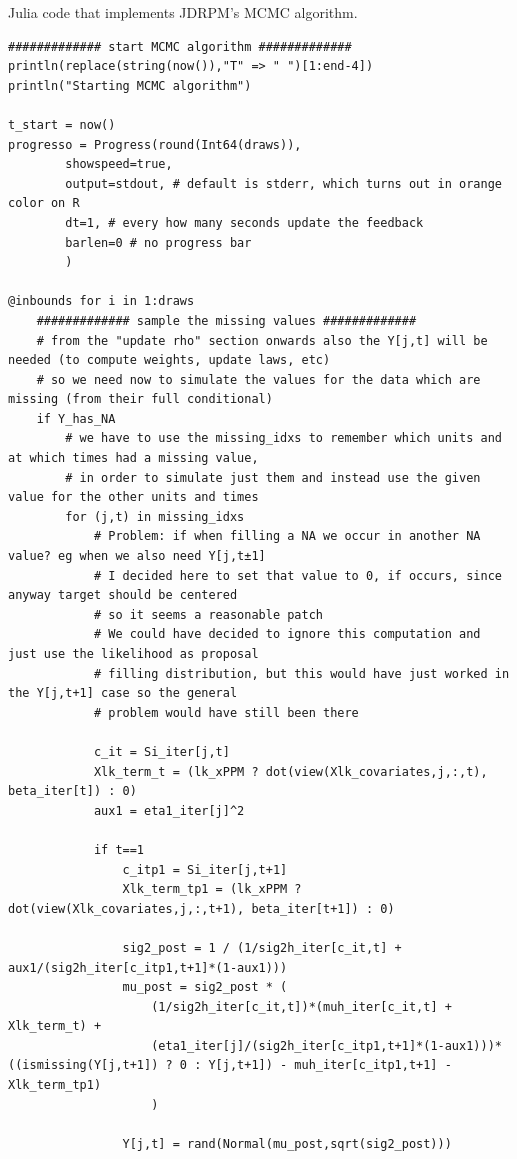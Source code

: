 \documentclass[12pt,	%
	a4paper,		%
	twoside,		%
	openright,		%
	titlepage,%
	]{book}
\theoremstyle{definition}
\newenvironment{code}{\captionsetup{type=listing}}{}
\begin{document}
\begin{code}
\caption[Julia code of the JDRPM algorithm]{Julia code that implements JDRPM's MCMC algorithm.}
\begin{verbatim}
############# start MCMC algorithm #############
println(replace(string(now()),"T" => " ")[1:end-4])
println("Starting MCMC algorithm")

t_start = now()
progresso = Progress(round(Int64(draws)),
		showspeed=true,
		output=stdout, # default is stderr, which turns out in orange color on R
		dt=1, # every how many seconds update the feedback
		barlen=0 # no progress bar
		)

@inbounds for i in 1:draws
	############# sample the missing values #############
	# from the "update rho" section onwards also the Y[j,t] will be needed (to compute weights, update laws, etc)
	# so we need now to simulate the values for the data which are missing (from their full conditional)
	if Y_has_NA
		# we have to use the missing_idxs to remember which units and at which times had a missing value,
		# in order to simulate just them and instead use the given value for the other units and times
		for (j,t) in missing_idxs
			# Problem: if when filling a NA we occur in another NA value? eg when we also need Y[j,t±1]
			# I decided here to set that value to 0, if occurs, since anyway target should be centered
			# so it seems a reasonable patch
			# We could have decided to ignore this computation and just use the likelihood as proposal
			# filling distribution, but this would have just worked in the Y[j,t+1] case so the general
			# problem would have still been there

			c_it = Si_iter[j,t]
			Xlk_term_t = (lk_xPPM ? dot(view(Xlk_covariates,j,:,t), beta_iter[t]) : 0)
			aux1 = eta1_iter[j]^2

			if t==1	
				c_itp1 = Si_iter[j,t+1]
				Xlk_term_tp1 = (lk_xPPM ? dot(view(Xlk_covariates,j,:,t+1), beta_iter[t+1]) : 0)

				sig2_post = 1 / (1/sig2h_iter[c_it,t] + aux1/(sig2h_iter[c_itp1,t+1]*(1-aux1)))
				mu_post = sig2_post * ( 
					(1/sig2h_iter[c_it,t])*(muh_iter[c_it,t] + Xlk_term_t) +
					(eta1_iter[j]/(sig2h_iter[c_itp1,t+1]*(1-aux1)))*((ismissing(Y[j,t+1]) ? 0 : Y[j,t+1]) - muh_iter[c_itp1,t+1] - Xlk_term_tp1)
					)

				Y[j,t] = rand(Normal(mu_post,sqrt(sig2_post)))


\end{verbatim}
\end{code}
\end{document}
